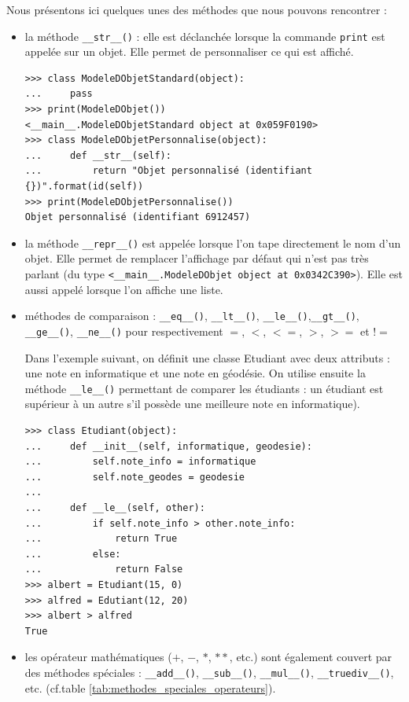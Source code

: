 \documentclass[12pt, a4paper]{article}
\begin{document}
Nous présentons ici quelques unes des méthodes que nous pouvons rencontrer :
\begin{itemize}
	\item la méthode \lstinline{__str__()} : elle est déclanchée lorsque la commande \lstinline{print} est appelée sur un objet. Elle permet de personnaliser ce qui est affiché.

	\begin{lstlisting}
>>> class ModeleDObjetStandard(object):
...     pass
>>> print(ModeleDObjet())
<__main__.ModeleDObjetStandard object at 0x059F0190>
>>> class ModeleDObjetPersonnalise(object):
...     def __str__(self):
...         return "Objet personnalisé (identifiant {})".format(id(self))
>>> print(ModeleDObjetPersonnalise())
Objet personnalisé (identifiant 6912457)
	\end{lstlisting}
	
	\item la méthode \lstinline{__repr__()} est appelée lorsque l'on tape directement le nom d'un objet. Elle permet de remplacer l'affichage par défaut qui n'est pas très parlant (du type \lstinline{<__main__.ModeleDObjet object at 0x0342C390>}). Elle est aussi appelé lorsque l'on affiche une liste.
	
	\item méthodes de comparaison : \lstinline{__eq__()}, \lstinline{__lt__()}, \lstinline{__le__()},\lstinline{__gt__()}, \lstinline{__ge__()}, \lstinline{__ne__()} pour respectivement $=$, $<$, $<=$, $>$, $>=$ et $!=$
	
	Dans l'exemple suivant, on définit une classe Etudiant avec deux attributs : une note en informatique et une note en géodésie. On utilise ensuite la méthode \lstinline{__le__()} permettant de comparer les étudiants : un étudiant est supérieur à un autre s'il possède une meilleure note en informatique).
	\begin{lstlisting}
>>> class Etudiant(object):
...     def __init__(self, informatique, geodesie):
...         self.note_info = informatique
...         self.note_geodes = geodesie
...
...     def __le__(self, other):
...         if self.note_info > other.note_info:
...             return True
...         else:
...             return False
>>> albert = Etudiant(15, 0)
>>> alfred = Edutiant(12, 20)
>>> albert > alfred
True
	\end{lstlisting}
	
	\item les opérateur mathématiques ($+$, $-$, $*$, $**$, etc.) sont également couvert par des méthodes spéciales : \lstinline{__add__()}, \lstinline{__sub__()}, \lstinline{__mul__()}, \lstinline{__truediv__()}, etc. (cf.table \ref{tab:methodes_speciales_operateurs}).
	

\end{itemize}
\end{document}
